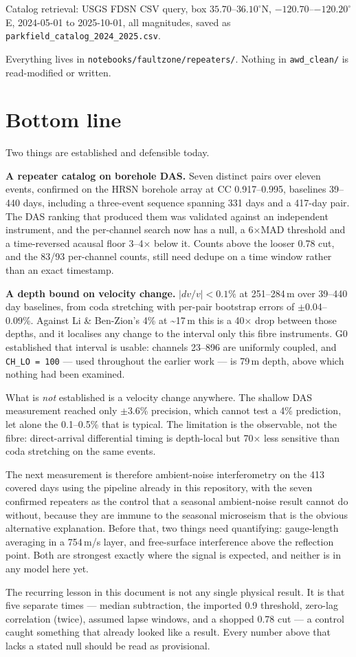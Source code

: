 \documentclass[11pt]{article}
\begin{document}
Catalog retrieval: USGS FDSN CSV query, box $35.70$--$36.10^\circ$N,
$-120.70$--$-120.20^\circ$E, 2024-05-01 to 2025-10-01, all magnitudes, saved as
\texttt{parkfield\_catalog\_2024\_2025.csv}.

Everything lives in \texttt{notebooks/faultzone/repeaters/}. Nothing in
\texttt{awd\_clean/} is read-modified or written.

\section{Bottom line}

Two things are established and defensible today.

\textbf{A repeater catalog on borehole DAS.} Seven distinct pairs over eleven
events, confirmed on the HRSN borehole array at CC 0.917--0.995, baselines 39--440
days, including a three-event sequence spanning 331 days and a 417-day pair. The
DAS ranking that produced them was validated against an independent instrument, and
the per-channel search now has a null, a 6$\times$MAD threshold and a time-reversed
acausal floor 3--4$\times$ below it. Counts above the looser 0.78 cut, and the 83/93
per-channel counts, still need dedupe on a time window rather than an exact
timestamp.

\textbf{A depth bound on velocity change.} $|dv/v| < 0.1\%$ at 251--284\,m over
39--440 day baselines, from coda stretching with per-pair bootstrap errors of
$\pm$0.04--0.09\%. Against Li \& Ben-Zion's 4\% at \textasciitilde17\,m this is a
40$\times$ drop between those depths, and it localises any change to the interval
only this fibre instruments. G0 established that interval is usable: channels
23--896 are uniformly coupled, and \texttt{CH\_LO = 100} --- used throughout the
earlier work --- is 79\,m depth, above which nothing had been examined.

What is \emph{not} established is a velocity change anywhere. The shallow DAS
measurement reached only $\pm$3.6\% precision, which cannot test a 4\% prediction,
let alone the 0.1--0.5\% that is typical. The limitation is the observable, not the
fibre: direct-arrival differential timing is depth-local but 70$\times$ less
sensitive than coda stretching on the same events.

The next measurement is therefore ambient-noise interferometry on the 413 covered
days using the pipeline already in this repository, with the seven confirmed
repeaters as the control that a seasonal ambient-noise result cannot do without,
because they are immune to the seasonal microseism that is the obvious alternative
explanation. Before that, two things need quantifying: gauge-length averaging in a
754\,m/s layer, and free-surface interference above the reflection point. Both are
strongest exactly where the signal is expected, and neither is in any model here
yet.

The recurring lesson in this document is not any single physical result. It is that
five separate times --- median subtraction, the imported 0.9 threshold, zero-lag
correlation (twice), assumed lapse windows, and a shopped 0.78 cut --- a control
caught something that already looked like a result. Every number above that lacks a
stated null should be read as provisional.
\end{document}
